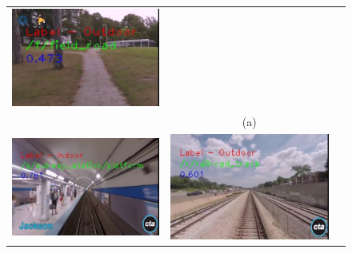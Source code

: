 \documentclass[twocolumn]{article}
\begin{document}
\begin{figure}[!htbp]
\begin{tabular*}{\textwidth}{lcr}
  \includegraphics[scale=\scaleVal]{4-fieldRoad} \\
  & (a) & \\
  \includegraphics[scale=\scaleVal]{6-subwayStation} &
  \includegraphics[scale=\scaleVal]{7-railroadTrack} &

\end{tabular*}
\end{figure}
\end{document}
